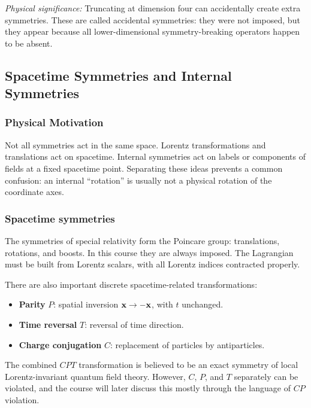 \documentclass[../main.tex]{subfiles}
\begin{document}
\textit{Physical significance:} Truncating at dimension four can accidentally create extra symmetries.  These are called accidental symmetries: they were not imposed, but they appear because all lower-dimensional symmetry-breaking operators happen to be absent.

\subsection*{Spacetime Symmetries and Internal Symmetries}

\subsubsection*{Physical Motivation}

Not all symmetries act in the same space.  Lorentz transformations and translations act on spacetime.  Internal symmetries act on labels or components of fields at a fixed spacetime point.  Separating these ideas prevents a common confusion: an internal ``rotation'' is usually not a physical rotation of the coordinate axes.

\subsubsection*{Spacetime symmetries}

The symmetries of special relativity form the Poincare group: translations, rotations, and boosts.  In this course they are always imposed.  The Lagrangian must be built from Lorentz scalars, with all Lorentz indices contracted properly.

There are also important discrete spacetime-related transformations:
\begin{itemize}
  \item \textbf{Parity} $P$: spatial inversion $\mathbf{x}\to-\mathbf{x}$, with $t$ unchanged.
  \item \textbf{Time reversal} $T$: reversal of time direction.
  \item \textbf{Charge conjugation} $C$: replacement of particles by antiparticles.
\end{itemize}

The combined $CPT$ transformation is believed to be an exact symmetry of local Lorentz-invariant quantum field theory.  However, $C$, $P$, and $T$ separately can be violated, and the course will later discuss this mostly through the language of $CP$ violation.
\end{document}

